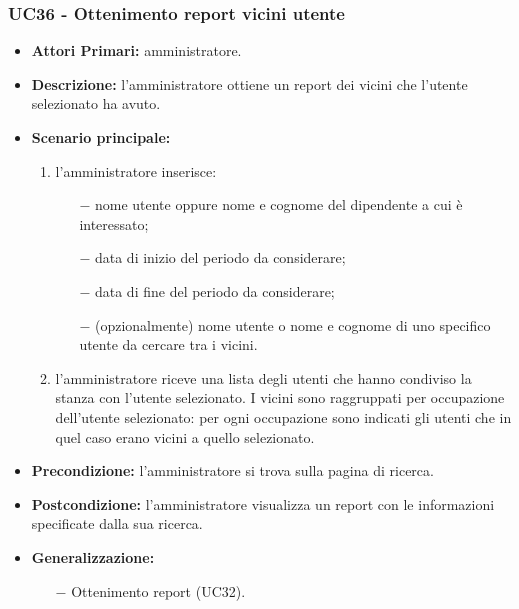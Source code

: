\subsubsection{ UC36 - Ottenimento report vicini utente}
\begin{itemize}
	\item\textbf{Attori Primari:} 
	amministratore.
	\item\textbf{Descrizione:} 
	l'amministratore ottiene un report dei vicini che l'utente selezionato ha avuto.
	\item\textbf{Scenario principale:} 
	\begin{enumerate}
		\item l'amministratore inserisce:
		\begin{itemize}
			\item[$-$] nome utente oppure nome e cognome del dipendente a cui è interessato;
			\item[$-$] data di inizio del periodo da considerare;
			\item[$-$] data di fine del periodo da considerare;
			\item[$-$] (opzionalmente) nome utente o nome e cognome di uno specifico utente da cercare tra i vicini.
		\end{itemize}
		\item l'amministratore riceve una lista degli utenti che hanno condiviso la stanza con l'utente selezionato. I vicini sono raggruppati per occupazione dell'utente selezionato: per ogni occupazione sono indicati gli utenti che in quel caso erano vicini a quello selezionato.
	\end{enumerate}
	\item\textbf{Precondizione:} 
	l'amministratore si trova sulla pagina di ricerca.
	\item\textbf{Postcondizione:}
	l'amministratore visualizza un report con le informazioni specificate dalla sua ricerca.
	\item\textbf{Generalizzazione:}
	\begin{itemize}
		\item[$-$] Ottenimento report (UC32).
	\end{itemize}
\end{itemize}


